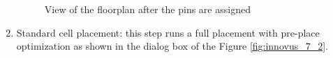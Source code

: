 \documentclass[a4paper,11pt]{article}%
\begin{document}
\begin{enumerate}[1.)]
	\begin{figure}[H]
		\centering
		\caption{View of the floorplan after the pins are assigned}
		\label{fig:innovus_6_1}
	\end{figure}
	
	\pagebreak
	\item Standard cell placement: this step runs a full placement with pre-place optimization as shown in the dialog box of the Figure \ref{fig:innovus_7_2}.
	

\end{enumerate}
\end{document}

